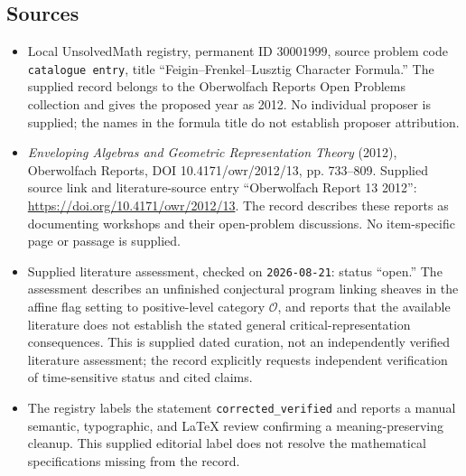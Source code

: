 \documentclass[11pt]{article}
\begin{document}
\subsection{Sources}
\begin{itemize}
\item Local UnsolvedMath registry, permanent ID \(30001999\), source problem code \texttt{catalogue entry}, title ``Feigin--Frenkel--Lusztig Character Formula.'' The supplied record belongs to the Oberwolfach Reports Open Problems collection and gives the proposed year as 2012. No individual proposer is supplied; the names in the formula title do not establish proposer attribution.
\item \emph{Enveloping Algebras and Geometric Representation Theory} (2012), Oberwolfach Reports, DOI 10.4171/owr/2012/13, pp. 733--809. Supplied source link and literature-source entry ``Oberwolfach Report 13 2012'': \url{https://doi.org/10.4171/owr/2012/13}. The record describes these reports as documenting workshops and their open-problem discussions. No item-specific page or passage is supplied.
\item Supplied literature assessment, checked on \texttt{2026-08-21}: status ``open.'' The assessment describes an unfinished conjectural program linking sheaves in the affine flag setting to positive-level category \(\mathcal O\), and reports that the available literature does not establish the stated general critical-representation consequences. This is supplied dated curation, not an independently verified literature assessment; the record explicitly requests independent verification of time-sensitive status and cited claims.
\item The registry labels the statement \texttt{corrected\_verified} and reports a manual semantic, typographic, and LaTeX review confirming a meaning-preserving cleanup. This supplied editorial label does not resolve the mathematical specifications missing from the record.
\end{itemize}
\end{document}
